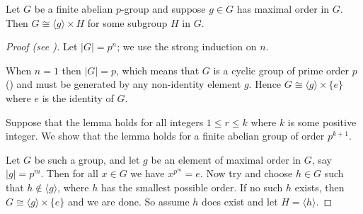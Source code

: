 \begin{lemma}\label{lemma-fundamental-theorem-of-finite-abelian-groups-2}
    Let $G$ be a finite abelian $p$-group and suppose $g \in G$ has maximal order in $G$. Then $G \cong \langle g \rangle \times H$ for some subgroup $H$ in $G$.
\end{lemma}
\begin{proof}[Proof (see {\cite[Lemma 13.9]{judson_beezer_2022}})]
    Let $|G| = p^n$; we use the strong induction on $n$.

    When $n = 1$ then $|G| = p$, which means that $G$ is a cyclic group of prime order $p$ () and must be generated by any non-identity element $g$. Hence $G \cong \langle g \rangle \times \{e\}$ where $e$ is the identity of $G$.

    Suppose that the lemma holds for all integers $1 \leq r \leq k$ where $k$ is some positive integer. We show that the lemma holds for a finite abelian group of order $p^{k+1}$.

    Let $G$ be such a group, and let $g$ be an element of maximal order in $G$, say $|g| = p^m$. Then for all $x \in G$ we have $x^{p^m} = e$. Now try and choose $h \in G$ such that $h \notin \langle g \rangle$, where $h$ has the smallest possible order. If no such $h$ exists, then $G \cong \langle g \rangle \times \{e\}$ and we are done. So assume $h$ does exist and let $H = \langle h \rangle$.


\end{proof}
